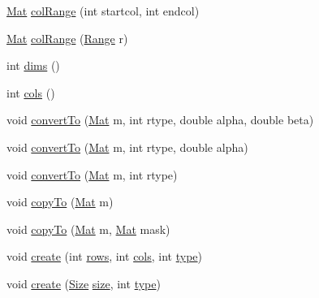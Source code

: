 \begin{DoxyCompactItemize}
\item 
\mbox{\hyperlink{classorg_1_1opencv_1_1core_1_1_mat}{Mat}} \mbox{\hyperlink{classorg_1_1opencv_1_1core_1_1_mat_a28a58bdd7241151451c966e41da7e38b}{col\+Range}} (int startcol, int endcol)
\item 
\mbox{\hyperlink{classorg_1_1opencv_1_1core_1_1_mat}{Mat}} \mbox{\hyperlink{classorg_1_1opencv_1_1core_1_1_mat_a2be44d10bfd5d8fa88d022b3b4dc773e}{col\+Range}} (\mbox{\hyperlink{classorg_1_1opencv_1_1core_1_1_range}{Range}} r)
\item 
int \mbox{\hyperlink{classorg_1_1opencv_1_1core_1_1_mat_a9da03786400df5d6ef7ff4217f9a93f9}{dims}} ()
\item 
int \mbox{\hyperlink{classorg_1_1opencv_1_1core_1_1_mat_adddf469e35679e67bb350f779433ea8d}{cols}} ()
\item 
void \mbox{\hyperlink{classorg_1_1opencv_1_1core_1_1_mat_aa783d679e1b68aa5f9da6434be761eb7}{convert\+To}} (\mbox{\hyperlink{classorg_1_1opencv_1_1core_1_1_mat}{Mat}} m, int rtype, double alpha, double beta)
\item 
void \mbox{\hyperlink{classorg_1_1opencv_1_1core_1_1_mat_a0b77b1b98daf56bf32d799e2fc597037}{convert\+To}} (\mbox{\hyperlink{classorg_1_1opencv_1_1core_1_1_mat}{Mat}} m, int rtype, double alpha)
\item 
void \mbox{\hyperlink{classorg_1_1opencv_1_1core_1_1_mat_acdff78cc87bef2565f8907113d0eec11}{convert\+To}} (\mbox{\hyperlink{classorg_1_1opencv_1_1core_1_1_mat}{Mat}} m, int rtype)
\item 
void \mbox{\hyperlink{classorg_1_1opencv_1_1core_1_1_mat_aa2d63f03533282ef5bd1f8dc0cbcbc0b}{copy\+To}} (\mbox{\hyperlink{classorg_1_1opencv_1_1core_1_1_mat}{Mat}} m)
\item 
void \mbox{\hyperlink{classorg_1_1opencv_1_1core_1_1_mat_ae1a7d7ed81f82bda92cb641c6060f2be}{copy\+To}} (\mbox{\hyperlink{classorg_1_1opencv_1_1core_1_1_mat}{Mat}} m, \mbox{\hyperlink{classorg_1_1opencv_1_1core_1_1_mat}{Mat}} mask)
\item 
void \mbox{\hyperlink{classorg_1_1opencv_1_1core_1_1_mat_a539b0a3690afb6b43047b50cbb787fee}{create}} (int \mbox{\hyperlink{classorg_1_1opencv_1_1core_1_1_mat_a1e925483fbe84a9dab2499cf91c17c84}{rows}}, int \mbox{\hyperlink{classorg_1_1opencv_1_1core_1_1_mat_adddf469e35679e67bb350f779433ea8d}{cols}}, int \mbox{\hyperlink{classorg_1_1opencv_1_1core_1_1_mat_a555bc7243135e2883afe54e7e5e92c79}{type}})
\item 
void \mbox{\hyperlink{classorg_1_1opencv_1_1core_1_1_mat_afd55f958255662f40a0bbe03813cb8b2}{create}} (\mbox{\hyperlink{classorg_1_1opencv_1_1core_1_1_size}{Size}} \mbox{\hyperlink{classorg_1_1opencv_1_1core_1_1_mat_a543d6f8a103a5f3d899030d76286f0cf}{size}}, int \mbox{\hyperlink{classorg_1_1opencv_1_1core_1_1_mat_a555bc7243135e2883afe54e7e5e92c79}{type}})

\end{DoxyCompactItemize}
